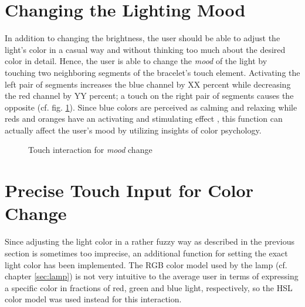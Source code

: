 \section{Changing the Lighting Mood}
In addition to changing the brightness, the user should be able to adjust the light's color in a casual way and without thinking too much about the desired color in detail. Hence, the user is able to change the \textit{mood} of the light by touching two neighboring segments of the bracelet's touch element. Activating the left pair of segments increases the blue channel by XX percent while decreasing the red channel by YY percent; a touch on the right pair of segments causes the opposite (cf. fig. \ref{fig:mood}). Since blue colors are perceived as calming and relaxing while reds and oranges have an activating and stimulating effect \cite{Rosenstein1985}, this function can actually affect the user's mood by utilizing insights of color psychology.

\begin{figure}[bth]
	\myfloatalign
	 \quad
	\caption{Touch interaction for \textit{mood} change} \label{fig:mood}
\end{figure}

\section{Precise Touch Input for Color Change}
Since adjusting the light color in a rather fuzzy way as described in the previous section is sometimes too imprecise, an additional function for setting the exact light color has been implemented. The RGB color model used by the lamp (cf. chapter \ref{sec:lamp}) is not very intuitive to the average user in terms of expressing a specific color in fractions of red, green and blue light, respectively, so the \ac{HSL} color model was used instead for this interaction.

